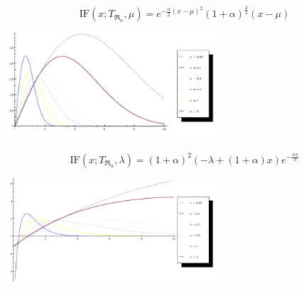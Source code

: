 \documentclass[11pt,a4paper]{beamer}
\begin{document}
\begin{frame}
	\begin{equation*}
		\mathrm{IF}(x;T_{\mathfrak{R}_\alpha},\mu) = e^{-\frac{\alpha}{2} (x-\mu )^2} (1+\alpha )^{\frac{3}{2}} (x-\mu )
	\end{equation*}
	\begin{center}
		\includegraphics[width = 3.1in]{IF-Exponential-mu.png}			
	\end{center}
\end{frame}

\begin{frame}
	\begin{equation*}
		\mathrm{IF}(x;T_{\mathfrak{R}_\alpha},\lambda) =	(1+\alpha )^2 ( - \lambda +(1+ \alpha)x) e^{-\frac{\alpha x}{\lambda }}
	\end{equation*}
	\begin{center}
		\includegraphics[width = 3.1in]{IF-Exponential-sigma.png}			
	\end{center}
\end{frame}
\end{document}
